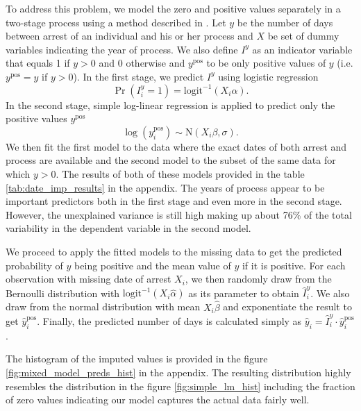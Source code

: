 To address this problem, we model the zero and positive values separately in a two-stage process 
using a method described in \citet[p. 537-538]{gelman_data_2006}. 
Let $y$ be the number of days between arrest of an individual and his or her process and $X$ be set of dummy variables indicating the year of process. We also define $I^y$ as an indicator variable that equals 1 if $y > 0$ and 0 otherwise and  $y^{\text{pos}}$ to be only positive values of $y$ (i.e. $y^{\text{pos}} = y$ if   $y > 0$).  In the first stage, we predict $I^y$  using logistic regression
\begin{equation}
\Pr\left( I_i^y = 1 \right)  = \text{logit}^{-1} \left(X_i \alpha \right).
\end{equation}
In the second stage, simple log-linear regression is applied to predict only the positive values $y^{\text{pos}}$
\begin{equation}
\log\left(y_i^{\text{pos}}\right) \sim \text{N} \left(X_i \beta, \sigma \right).
\end{equation}
We then fit the first model to the data where the exact dates of both arrest and process are available and the second model to the subset of the same  data for which $y > 0$.
The results of both of these models provided in the table \ref{tab:date_imp_results} in the appendix. The years of process appear to be important predictors both in the first stage and even more in the second stage. 
However, the unexplained variance is still high making up about 76\% of the total variability in the dependent variable in the second model. 

We  proceed to apply the fitted models to the missing data to get the predicted probability of $y$  being positive and the mean value of $y$ if it is positive. For each observation with missing date of arrest $X_i$, we then randomly draw from the Bernoulli distribution with  $\text{logit}^{-1} \left(X_i \hat\alpha \right)$ as its parameter to obtain $\hat I_i^y$. We also draw from the normal distribution with mean $X_i \hat\beta$ and exponentiate the result to get $\hat y_i^{\text{pos}}$. Finally, the predicted number of days is calculated simply as $\hat y_i = \hat I_i^y \cdot \hat y_i^{\text{pos}}$. 

The histogram of the imputed values is provided in the figure \ref{fig:mixed_model_preds_hist} in the appendix. 
The resulting distribution  highly resembles the distribution  in the figure \ref{fig:simple_lm_hist} including the fraction of zero values indicating our model captures the actual data fairly well. 


